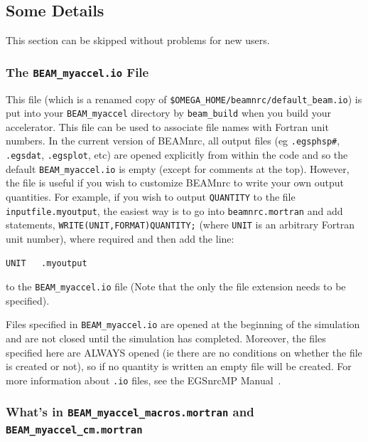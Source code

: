 \documentclass[12pt,twoside]{article}
\begin{document}
\subsection{Some Details}
\label{od}

This section can be skipped without problems for new users.

\subsubsection{The {\tt BEAM\_myaccel.io} File}
\label{iofilesect}
This file (which is a renamed copy of
{\tt \$OMEGA\_HOME/beamnrc/default\_beam.io}) is put into your
{\tt BEAM\_myaccel} directory by {\tt beam\_build}
when you build your accelerator.  This file can be used to associate
file names with Fortran unit numbers.  In the current version of
BEAMnrc, all output files (eg {\tt .egsphsp\#}, {\tt .egsdat}, {\tt .egsplot},
etc) are opened explicitly from within the code and so the default
{\tt BEAM\_myaccel.io} is empty (except for comments at the top).  However,
the file is useful if you wish to customize BEAMnrc to write your own
output quantities.  For example, if you wish to output {\tt QUANTITY} to
the file {\tt inputfile.myoutput}, the easiest way is to go into
{\tt beamnrc.mortran} and add statements, {\tt WRITE(UNIT,FORMAT)QUANTITY;}
(where {\tt UNIT} is an arbitrary Fortran unit number), where required and then
add the line:
\begin{verbatim}
UNIT   .myoutput
\end{verbatim}
to the {\tt BEAM\_myaccel.io} file (Note that the only the file extension
needs to be specified).

Files specified in
{\tt BEAM\_myaccel.io} are opened at the beginning of the simulation
and are not closed until the simulation has completed.  Moreover, the files
specified here are ALWAYS opened (ie there are no conditions on whether
the file is created or not), so if no quantity is written an empty
file will be created.
For more information about {\tt .io} files, see the EGSnrcMP
Manual~\cite{Ka03}.

\subsubsection{What's in {\tt BEAM\_myaccel\_macros.mortran} and
{\tt BEAM\_myaccel\_cm.mortran}}
\end{document}
